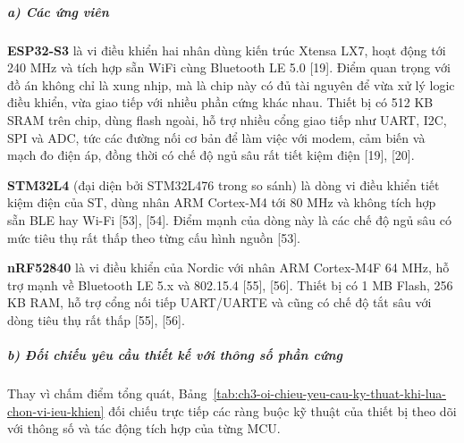 \documentclass[a4paper]{extarticle}
\newcommand{\tabref}[1]{Bảng~\ref{#1}}
\begin{document}
\subparagraph{a) Các ứng viên}\label{a-cuxe1c-ux1ee9ng-viuxean}

\textbf{ESP32-S3} là vi điều khiển hai nhân dùng kiến trúc Xtensa LX7,
hoạt động tới 240 MHz và tích hợp sẵn WiFi cùng Bluetooth LE 5.0
{[}19{]}. Điểm quan trọng với đồ án không chỉ là xung nhịp, mà là chip
này có đủ tài nguyên để vừa xử lý logic điều khiển, vừa giao tiếp với
nhiều phần cứng khác nhau. Thiết bị có 512 KB SRAM trên chip, dùng flash
ngoài, hỗ trợ nhiều cổng giao tiếp như UART, I2C, SPI và ADC, tức các
đường nối cơ bản để làm việc với modem, cảm biến và mạch đo điện áp,
đồng thời có chế độ ngủ sâu rất tiết kiệm điện {[}19{]}, {[}20{]}.

\textbf{STM32L4} (đại diện bởi STM32L476 trong so sánh) là dòng vi điều
khiển tiết kiệm điện của ST, dùng nhân ARM Cortex-M4 tới 80 MHz và
không tích hợp sẵn BLE hay Wi-Fi {[}53{]}, {[}54{]}. Điểm mạnh của dòng
này là các chế độ ngủ sâu có mức tiêu thụ rất thấp theo từng cấu hình
nguồn {[}53{]}.

\textbf{nRF52840} là vi điều khiển của Nordic với nhân ARM Cortex-M4F 64
MHz, hỗ trợ mạnh về Bluetooth LE 5.x và 802.15.4 {[}55{]}, {[}56{]}.
Thiết bị có 1 MB Flash, 256 KB RAM, hỗ trợ cổng nối tiếp UART/UARTE và
cũng có chế độ tắt sâu với dòng tiêu thụ rất thấp {[}55{]}, {[}56{]}.

\subparagraph{b) Đối chiếu yêu cầu thiết kế với thông số phần
cứng}\label{b-ux111ux1ed1i-chiux1ebfu-yuxeau-cux1ea7u-thiux1ebft-kux1ebf-vux1edbi-thuxf4ng-sux1ed1-phux1ea7n-cux1ee9ng}

Thay vì chấm điểm tổng quát, \tabref{tab:ch3-oi-chieu-yeu-cau-ky-thuat-khi-lua-chon-vi-ieu-khien} đối chiếu trực tiếp các ràng buộc
kỹ thuật của thiết bị theo dõi với thông số và tác động tích hợp của từng MCU.
\end{document}

